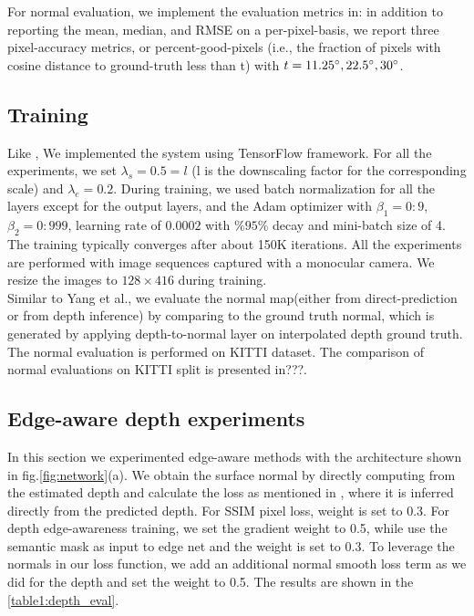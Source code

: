 \documentclass[10pt,twocolumn,letterpaper]{article}
\begin{document}
For normal evaluation, we
implement the evaluation metrics in\cite{fouhey2013data}: in addition to reporting the mean, median, and
RMSE on a per-pixel-basis, we report three pixel-accuracy
metrics, or percent-good-pixels (i.e., the fraction of pixels with cosine distance to ground-truth less than t) with $t = 11.25\degree, 22.5\degree, 30\degree$.

\subsection{Training}
Like \cite{zhou2017unsupervised}, We implemented the system using TensorFlow framework. For all the experiments, we set $\lambda_s = 0.5=l$ (l is the downscaling factor for the corresponding scale) and $\lambda_e = 0.2$. During training, we used batch normalization for all the layers except for the output layers, and the Adam optimizer with $\beta_1 = 0:9$, $\beta_2 = 0:999$, learning rate of $0.0002$ with $\%95\%$ decay and mini-batch size of 4. The training typically converges after about 150K iterations. All the experiments are performed with image sequences captured with a monocular camera. We resize the images to $128 × 416$ during training.
\\
Similar to Yang et al.\cite{yang2018lego}, we evaluate the normal map(either from direct-prediction or from depth inference) by comparing to the ground truth normal, which is generated by applying depth-to-normal layer on interpolated depth ground truth. The normal evaluation is performed
on KITTI dataset. The comparison of normal evaluations on KITTI split is presented in???. 
\subsection{Edge-aware depth experiments}
In this section we experimented edge-aware methods with the architecture shown in fig.\ref{fig:network}(a). We obtain the surface normal by directly computing from the estimated depth and calculate the loss as mentioned in \cite{yang2017unsupervised}, where it is inferred  directly from the predicted depth. For SSIM pixel loss, weight is set to 0.3. For depth edge-awareness training, we set the gradient weight to 0.5, while use the semantic mask as input to edge net and the weight is set to 0.3.
To leverage the normals in our loss function, we add an additional normal smooth loss term as we did for the depth and set the weight to 0.5. The results are shown in the \ref{table1:depth_eval}.
\end{document}
